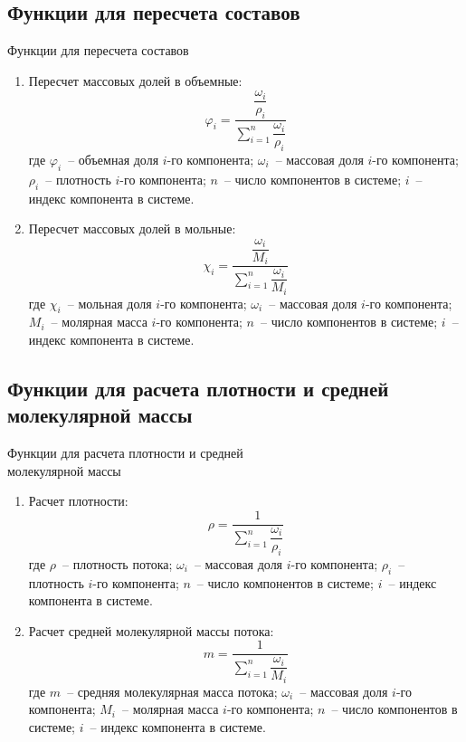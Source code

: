 \documentclass[aspectratio=169, mathserif]{beamer}%
\begin{document}
\subsection{Функции для пересчета составов}
\begin{frame}[fragile]{Функции для пересчета составов}
\scriptsize
\begin{enumerate}
\item Пересчет массовых долей в объемные:
\vfill
\begin{equation*}
	\varphi _i = \dfrac{\dfrac{\omega _i}{\rho _i}}{\sum \limits _{i=1}^{n} \dfrac{\omega _i}{\rho _i}}
\end{equation*}
\vfill
где $\varphi _i$~-- объемная доля $i$-го компонента; $\omega _i$~-- массовая доля $i$-го компонента; $\rho _i$~-- плотность $i$-го компонента; $n$~-- число компонентов в системе; $i$~-- индекс компонента в системе.
\vfill
\item Пересчет массовых долей в мольные:
\vfill
$$
	\chi _i = \dfrac{\dfrac{\omega _i}{M_i}}{\sum \limits_{i=1}^{n}\dfrac{\omega _i}{M_i}}
$$
\vfill
где $\chi _i$~-- мольная доля $i$-го компонента; $\omega _i$~-- массовая доля $i$-го компонента; $M_i$~-- молярная масса $i$-го компонента; $n$~-- число компонентов в системе; $i$~-- индекс компонента в системе.
\vfill
\end{enumerate}
\vfill
\end{frame}


\subsection{Функции для расчета плотности  и средней \\ молекулярной массы}
\begin{frame}[fragile]{Функции для расчета плотности и средней \\ молекулярной массы}
\scriptsize
\begin{enumerate}
\item Расчет плотности:
\vfill
\begin{equation*}
	\rho = \dfrac{1}{\sum \limits_{i=1}^{n}\dfrac{\omega_i}{\rho_i}}
\end{equation*}
\vfill
где $\rho$~-- плотность потока; $\omega _i$~-- массовая доля $i$-го компонента; $\rho _i$~-- плотность $i$-го компонента; $n$~-- число компонентов в системе; $i$~-- индекс компонента в системе.
\vfill
\item Расчет средней молекулярной массы потока:
\vfill
$$
	m = \dfrac{1}{\sum \limits_{i=1}^{n}\dfrac{\omega_i}{M_i}}
$$
\vfill
где $m$~-- средняя молекулярная масса потока; $\omega _i$~-- массовая доля $i$-го компонента; $M_i$~-- молярная масса $i$-го компонента; $n$~-- число компонентов в системе; $i$~-- индекс компонента в системе.
\vfill
\end{enumerate}
\vfill
\end{frame}
\end{document}
